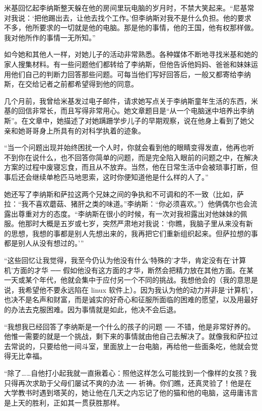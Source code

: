 米基回忆起李纳斯整天躲在他的房间里玩电脑的岁月时，不禁大笑起来。“尼基常对我说：‘把他踢出去，让他去找个工作。’但李纳斯对我不是什么负担。他的要求不多，他所要求的一切就是他的电脑。那是他的事情，他的王国，他有权那样做。我对他所作的事情一无所知。”

如今她和其他人一样，对她儿子的活动非常熟悉。各种媒体不断地寻找米基和她的家人搜集材料。有一些问题他们都转给了李纳斯，但他告诉他妈妈、爸爸和妹妹运用他们自己的判断力回答那些问题。可每当他们写好回答后，一般又都寄给李纳斯，在交给记者之前都希望得到他的同意。

几个月前，我曾给米基发过电子邮件，请求她写点关于李纳斯童年生活的东西，米基的回信非常长，而且写得非常用心。她文章题目是“从一个电脑迷中培养出李纳斯”。在文章中，她描述了对她蹒跚学步儿子的早期观察，说在他身上看到了她父亲和她哥哥身上所具有的对科学执着的迹象。

“当一个问题出现并始终困扰一个人时，你就会看到他的眼睛变得发直，他再也听不到你在说什么，也不回答你简单的问题，而是完全陷入眼前的问题之中，在解决方案的过程中废寝忘食，而且从不放弃。当然，他在日常生活中会被琐事打断，但事后还会继续单枪匹马地思索，这时你便知道他是什么样的人了。”

她还写了李纳斯和萨拉这两个兄妹之间的争执和不可调和的不一致（比如，萨拉：“我不喜欢蘑菇、猪肝之类的味道。”李纳斯：“你必须喜欢。”）他俩偶尔也会流露出尊重对方的态度。“李纳斯在很小的时候，有一次对我袒露出对他妹妹的佩服。他那时大概是五岁或七岁，突然严肃地对我说：‘你瞧，我脑子里从来没有新的思想，我想的事都是别人先想出来的，我再把它们重新组织起来。但萨拉想的事都是别人从没有想过的。’”

“这些回忆让我觉得，我至今仍认为他没有什么‘特殊的’才华，肯定没有在‘计算机’方面的才华 ── 假如他没有这方面的才华，断然会把精力放在其他方面。在某一天或某个年代，他就会集中于应付另一个不同的挑战。我想他会的（我的意思是说，我希望他不要永远陷在 linux 软件上）。因为我认为他的动力并非是‘计算机’，也决不是名声和财富，而是诚实的好奇心和征服所面临的困难的愿望，以及用最好的办法去克服困难。因为事情就是如此，他决不会后退。

“我想我已经回答了李纳斯是一个什么的孩子的问题 ── 不错，他是非常好养的。他惟一需要的就是一个挑战，剩下来的事情就由他自己去解决了。就像我和萨拉过去常说的，只要给他一间斗室，里面放上一台电脑，再给他一些面条吃，他就会觉得无比幸福。

“除了……自他打小起我就一直揪着心：照他这样怎么可能找到一个像样的女孩？我只得再次求助于父母们屡试不爽的办法 ── 祈祷。你们瞧，还真灵验了！他是在大学教书时遇到塔芙的，她让他在几天之内忘记了他的猫和他的电脑，这毋庸讳言是上天的胜利，正如其一贯获胜那样。


